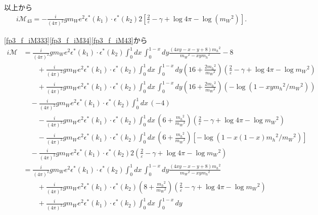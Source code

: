 以上から
\begin{align}
  i\mathcal{M}_{43} = - \frac{i}{(4\pi)^2} g m_W e^2 \epsilon^\ast(k_1) \cdot \epsilon^\ast(k_2)
  2 \left[ \frac{2}{\varepsilon} - \gamma + \log 4\pi - \log(m_W{}^2) \right] .
  \label{fp3_f_iM43}
\end{align}

\eqref{fp3_f_iM333}\eqref{fp3_f_iM34}\eqref{fp3_f_iM43}から
\begin{align*}
  i\mathcal{M}
  &= \frac{i}{(4\pi)^2} g m_W e^2 \epsilon^\ast(k_1) \cdot \epsilon^\ast(k_2) \int_0^1 dx\, \int_0^{1-x} dy
  \frac{(4xy-x-y+8)m_h{}^2}{m_W{}^2-xym_h{}^2} - 8 \\
  &\qquad + \frac{i}{(4\pi)^2} g m_W e^2 \epsilon^\ast(k_1) \cdot \epsilon^\ast(k_2) \int_0^1 dx\, \int_0^{1-x} dy
  \left( 16 + \frac{2m_h{}^2}{m_W{}^2} \right) \left( \frac{2}{\varepsilon} - \gamma + \log 4\pi - \log m_W{}^2 \right) \\
  &\qquad + \frac{i}{(4\pi)^2} g m_W e^2 \epsilon^\ast(k_1) \cdot \epsilon^\ast(k_2) \int_0^1 dx\, \int_0^{1-x} dy
  \left( 16 + \frac{2m_h{}^2}{m_W{}^2} \right) \left( - \log(1 - xym_h{}^2/m_W{}^2) \right) \\
  &\quad - \frac{i}{(4\pi)^2} g m_W e^2 \epsilon^\ast(k_1) \cdot \epsilon^\ast(k_2) \int_0^1 dx\, (-4) \\
  &\qquad - \frac{i}{(4\pi)^2} g m_W e^2 \epsilon^\ast(k_1) \cdot \epsilon^\ast(k_2) \int_0^1 dx\,
  \left( 6 + \frac{m_h{}^2}{m_W{}^2} \right)
  \left( \frac{2}{\varepsilon} - \gamma + \log 4\pi - \log m_W{}^2 \right) \\
  &\qquad - \frac{i}{(4\pi)^2} g m_W e^2 \epsilon^\ast(k_1) \cdot \epsilon^\ast(k_2) \int_0^1 dx\,
  \left( 6 + \frac{m_h{}^2}{m_W{}^2} \right) \left[ - \log(1 - x(1-x)m_h{}^2/m_W{}^2) \right] \\
  &\quad - \frac{i}{(4\pi)^2} g m_W e^2 \epsilon^\ast(k_1) \cdot \epsilon^\ast(k_2)
  2 \left( \frac{2}{\varepsilon} - \gamma + \log 4\pi - \log m_W{}^2 \right) \\
  &= \frac{i}{(4\pi)^2} g m_W e^2 \epsilon^\ast(k_1) \cdot \epsilon^\ast(k_2) \int_0^1 dx\, \int_0^{1-x} dy
  \frac{(4xy-x-y+8)m_h{}^2}{m_W{}^2-xym_h{}^2} \\
  &\qquad + \frac{i}{(4\pi)^2} g m_W e^2 \epsilon^\ast(k_1) \cdot \epsilon^\ast(k_2)
  \left( 8 + \frac{m_h{}^2}{m_W{}^2} \right) \left( \frac{2}{\varepsilon} - \gamma + \log 4\pi - \log m_W{}^2 \right) \\
  &\qquad + \frac{i}{(4\pi)^2} g m_W e^2 \epsilon^\ast(k_1) \cdot \epsilon^\ast(k_2) \int_0^1 dx\, \int_0^{1-x} dy

\end{align*}
